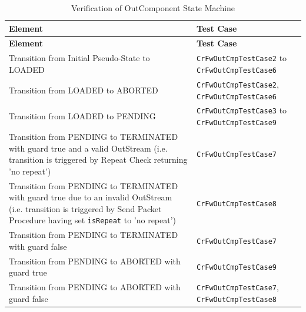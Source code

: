 \documentclass[a4paper,10pt]{article}
\begin{document}
\begin{longtable}{|>{\raggedright}p{6.0cm}|P{5.0cm}|}
\caption{Verification of OutComponent State Machine}
\label{tab:verOutComponentSM}\\
\hline
{}
\textbf{Element} & \textbf{Test Case} \\
\hline
\endfirsthead
{}
\textbf{Element} & \textbf{Test Case} \\
\hline
\endhead
Transition from Initial Pseudo-State to LOADED  & \texttt{CrFwOutCmpTestCase2} to \texttt{CrFwOutCmpTestCase6}\\
\hline
Transition from LOADED to ABORTED  & \texttt{CrFwOutCmpTestCase2}, \texttt{CrFwOutCmpTestCase6}\\
\hline
Transition from LOADED to PENDING  & \texttt{CrFwOutCmpTestCase3} to \texttt{CrFwOutCmpTestCase9}\\
\hline
Transition from PENDING to TERMINATED with guard true and a valid OutStream (i.e. transition is triggered by Repeat Check returning 'no repeat') & \texttt{CrFwOutCmpTestCase7}\\
\hline
Transition from PENDING to TERMINATED with guard true due to an invalid OutStream (i.e. transition is triggered by Send Packet Procedure having set \texttt{isRepeat} to 'no repeat') & \texttt{CrFwOutCmpTestCase8}\\
\hline
Transition from PENDING to TERMINATED with guard false & \texttt{CrFwOutCmpTestCase7}\\
\hline
Transition from PENDING to ABORTED with guard true & \texttt{CrFwOutCmpTestCase9}\\
\hline
Transition from PENDING to ABORTED with guard false & \texttt{CrFwOutCmpTestCase7}, \texttt{CrFwOutCmpTestCase8}\\
\hline
\end{longtable}
\end{document}
